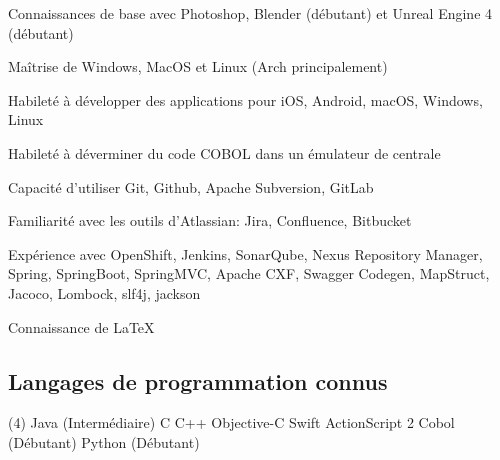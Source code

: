 \begin{cvitems}
\item{Connaissances de base avec Photoshop, Blender (débutant) et Unreal Engine 4 (débutant)}
\item{Maîtrise de Windows, MacOS et Linux (Arch principalement)}
\item{Habileté à développer des applications pour iOS, Android, macOS, Windows, Linux}
\item{Habileté à déverminer du code COBOL dans un émulateur de centrale}
\item{Capacité d'utiliser Git, Github, Apache Subversion, GitLab}
\item{Familiarité avec les outils d'Atlassian: Jira, Confluence, Bitbucket}
\item{Expérience avec OpenShift, Jenkins, SonarQube, Nexus Repository Manager, Spring, SpringBoot, SpringMVC, Apache CXF, Swagger Codegen, MapStruct, Jacoco, Lombock, slf4j, jackson}
\item{Connaissance de LaTeX}
\end{cvitems}
\subsection*{Langages de programmation connus}
\begin{tasks}(4)
    \task[•] Java (Intermédiaire) \task[•] C
    \task[•] C++ \task[•] Objective-C
    \task[•] Swift \task[•] ActionScript 2
    \task[•] Cobol (Débutant) \task[•] Python (Débutant)
\end{tasks}

